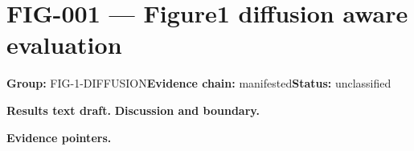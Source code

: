 \clearpage
\section{FIG-001 --- Figure1 diffusion aware evaluation}
\label{figpage:fig-001}
\textbf{Group:} FIG-1-DIFFUSION\quad \textbf{Evidence chain:} manifested\quad \textbf{Status:} unclassified

\textbf{Results text draft.} 
\textbf{Discussion and boundary.} 


\textbf{Evidence pointers.}



\vfill
